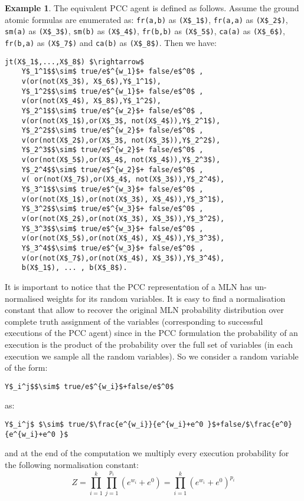 \documentclass[letterpaper]{article}
\theoremstyle{plain}
\theoremstyle{definition}
\theoremstyle{remark}
\theoremstyle{definition}
\newtheorem{example}{Example}[section]
\begin{document}
\begin{example}
The equivalent PCC agent is defined as follows. Assume the ground atomic formulas are enumerated as: \lstinline|fr(a,b)| as \lstinline|(X$_1$)|, \lstinline|fr(a,a)| as \lstinline|(X$_2$)|, \lstinline|sm(a)| as \lstinline|(X$_3$)|, \lstinline|sm(b)| as \lstinline|(X$_4$)|, \lstinline|fr(b,b)| as \lstinline|(X$_5$)|, \lstinline|ca(a)| as \lstinline|(X$_6$)|, \lstinline|fr(b,a)| as \lstinline|(X$_7$)| and \lstinline|ca(b)| as \lstinline|(X$_8$)|. Then we have:
\begin{lstlisting}[mathescape=true]
jt(X$_1$,...,X$_8$) $\rightarrow$ 
	Y$_1^1$$\sim$ true/e$^{w_1}$+ false/e$^0$ , 
	v(or(not(X$_3$), X$_6$),Y$_1^1$),
	Y$_1^2$$\sim$ true/e$^{w_1}$+ false/e$^0$ , 
	v(or(not(X$_4$), X$_8$),Y$_1^2$),	
	Y$_2^1$$\sim$ true/e$^{w_2}$+ false/e$^0$ ,
	v(or(not(X$_1$),or(X$_3$, not(X$_4$)),Y$_2^1$),
	Y$_2^2$$\sim$ true/e$^{w_2}$+ false/e$^0$ ,
	v(or(not(X$_2$),or(X$_3$, not(X$_3$)),Y$_2^2$),
	Y$_2^3$$\sim$ true/e$^{w_2}$+ false/e$^0$ ,
	v(or(not(X$_5$),or(X$_4$, not(X$_4$)),Y$_2^3$),
	Y$_2^4$$\sim$ true/e$^{w_2}$+ false/e$^0$ ,
	v( or(not(X$_7$),or(X$_4$, not(X$_3$)),Y$_2^4$),
	Y$_3^1$$\sim$ true/e$^{w_3}$+ false/e$^0$ ,
	v(or(not(X$_1$),or(not(X$_3$), X$_4$)),Y$_3^1$),
	Y$_3^2$$\sim$ true/e$^{w_3}$+ false/e$^0$ ,
	v(or(not(X$_2$),or(not(X$_3$), X$_3$)),Y$_3^2$),
	Y$_3^3$$\sim$ true/e$^{w_3}$+ false/e$^0$ ,
	v(or(not(X$_5$),or(not(X$_4$), X$_4$)),Y$_3^3$),	
	Y$_3^4$$\sim$ true/e$^{w_3}$+ false/e$^0$ , 
	v(or(not(X$_7$),or(not(X$_4$), X$_3$)),Y$_3^4$),
	b(X$_1$), ... , b(X$_8$).
\end{lstlisting}
\end{example}


It is important to notice that the PCC representation of a MLN has un-normalised weights for its random variables. It is easy to find a normalisation constant that allow to recover the original MLN probability distribution over complete truth assignment of the variables (corresponding to successful executions of the PCC agent) since in the PCC formulation the probability of an execution is the product of the probability over the full set of variables (in each execution we sample all the random variables). So we consider a random variable of the form:
\begin{lstlisting}[mathescape=true]
Y$_i^j$$\sim$ true/e$^{w_i}$+false/e$^0$
\end{lstlisting}
as:
\begin{lstlisting}[mathescape=true]
Y$_i^j$ $\sim$ true/$\frac{e^{w_i}}{e^{w_i}+e^0 }$+false/$\frac{e^0}{e^{w_i}+e^0 }$
\end{lstlisting}
 and at the end of the computation we multiply every execution probability for the following normalisation constant:
 $$Z=\prod_{i=1}^k \prod_{j=1}^{p_i} (e^{w_i} +e^0)=\prod_{i=1}^k (e^{w_i} +e^0)^{p_i}$$
\end{document}
